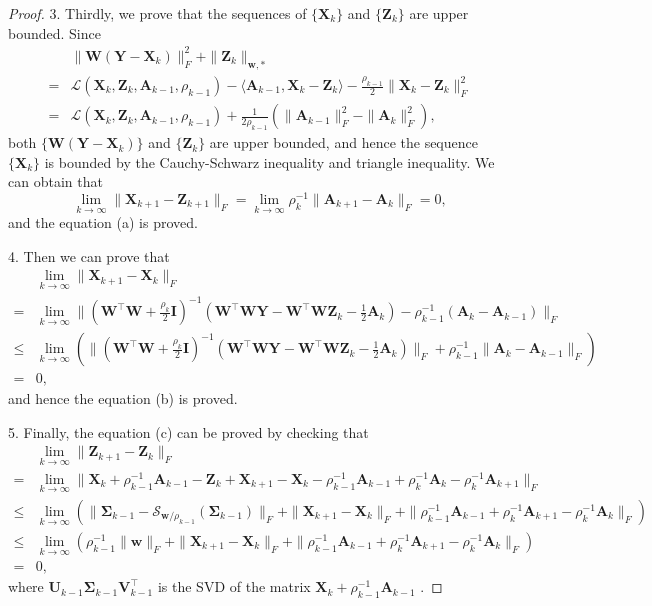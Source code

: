 \begin{proof}
3. Thirdly, we prove that the sequences of 
$\{\bm{X}_{k}\}$ and $\{\bm{Z}_{k}\}$ are upper bounded. Since 
\begin{align}
&\|\bm{W}(\bm{Y}-\bm{X}_{k})\|_{F}^{2}
+
\|\bm{Z}_{k}\|_{\bm{w},*}
\\
=
&
\mathcal{L}(\bm{X}_{k},\bm{Z}_{k},\bm{A}_{k-1},\rho_{k-1})
-
\langle
\bm{A}_{k-1},
\bm{X}_{k}-\bm{Z}_{k}
\rangle
-
\frac{\rho_{k-1}}{2}
\|
\bm{X}_{k}-\bm{Z}_{k}
\|_{F}^{2}
\\
=
&
\mathcal{L}(\bm{X}_{k},\bm{Z}_{k},\bm{A}_{k-1},\rho_{k-1})
+
\frac{1}{2\rho_{k-1}}
(
\|
\bm{A}_{k-1}
\|_{F}^{2}
-
\|
\bm{A}_{k}
\|_{F}^{2}
)
,
\end{align}
both $\{\bm{W}(\bm{Y}-\bm{X}_{k})\}$ and $\{\bm{Z}_{k}\}$ are upper bounded, and hence
the sequence $\{\bm{X}_{k}\}$ is bounded by the Cauchy-Schwarz inequality and triangle inequality.
We can obtain that 
\begin{equation}
\label{equ8-30}
\lim_{k \to \infty} 
\|\bm{X}_{k+1}-\bm{Z}_{k+1}\|_{F}
=
\lim_{k \to \infty} 
\rho_{k}^{-1}
\|
\bm{A}_{k+1}
-
\bm{A}_{k}
\|_{F}
=
0,
\end{equation}
and the equation (a) is proved.

4. Then we can prove that 
\begin{align}
&
\lim_{k \to \infty} 
\|
\bm{X}_{k+1}
-
\bm{X}_{k}
\|_{F}
\\
=
&
\lim_{k \to \infty} 
\|
(\bm{W}^{\top}\bm{W}
+
\frac{\rho_{k}}{2}
\bm{I})^{-1}
(\bm{W}^{\top}\bm{W}\bm{Y}
-
\bm{W}^{\top}\bm{W}\bm{Z}_{k}
-
\frac{1}{2}
\bm{A}_{k})
-
\rho_{k-1}^{-1}
(\bm{A}_{k}-\bm{A}_{k-1})
\|_{F}
\\
\le
&
\lim_{k \to \infty} 
(
\|
(\bm{W}^{\top}\bm{W}
+
\frac{\rho_{k}}{2}
\bm{I})^{-1}
(\bm{W}^{\top}\bm{W}\bm{Y}
-
\bm{W}^{\top}\bm{W}\bm{Z}_{k}
-
\frac{1}{2}
\bm{A}_{k})
\|_{F}
+
\rho_{k-1}^{-1}\|
\bm{A}_{k}-\bm{A}_{k-1}
\|_{F}
)
\\
=
&
0,
\end{align}
and hence the equation (b) is proved. 

5. Finally, the equation (c) can be proved by checking that 
\begin{align}
&
\lim_{k \to \infty} 
\|
\bm{Z}_{k+1}-\bm{Z}_{k}
\|_{F}
\\
=
&
\lim_{k \to \infty} 
\|
\bm{X}_{k}+\rho_{k-1}^{-1}\bm{A}_{k-1}-\bm{Z}_{k}
+
\bm{X}_{k+1}-\bm{X}_{k}
-
\rho_{k-1}^{-1}
\bm{A}_{k-1}
+
\rho_{k}^{-1}
\bm{A}_{k}
-
\rho_{k}^{-1}
\bm{A}_{k+1}
\|_{F}
\\
\le
&
\lim_{k \to \infty} 
(
\|
\bm{\Sigma}_{k-1}-\mathcal{S}_{\bm{w}/\rho_{k-1}}(\bm{\Sigma}_{k-1})
\|_{F}
+
\|
\bm{X}_{k+1}-\bm{X}_{k}
\|_{F}
+
\|
\rho_{k-1}^{-1}\bm{A}_{k-1}
+
\rho_{k}^{-1}\bm{A}_{k+1}
-
\rho_{k}^{-1}\bm{A}_{k}
\|_{F}
)
\\
\le
&
\lim_{k \to \infty} 
(
\rho_{k-1}^{-1}
\|
\bm{w}
\|_{F}
+
\|
\bm{X}_{k+1}-\bm{X}_{k}
\|_{F}
+
\|
\rho_{k-1}^{-1}\bm{A}_{k-1}
+
\rho_{k}^{-1}\bm{A}_{k+1}
-
\rho_{k}^{-1}\bm{A}_{k}
\|_{F}
)
\\
=
&
0
,
\end{align}
where $\bm{U}_{k-1}\bm{\Sigma}_{k-1}\bm{V}_{k-1}^{\top}$ is the SVD of the matrix $\bm{X}_{k}+\rho_{k-1}^{-1}\bm{A}_{k-1}$
.
\end{proof}


